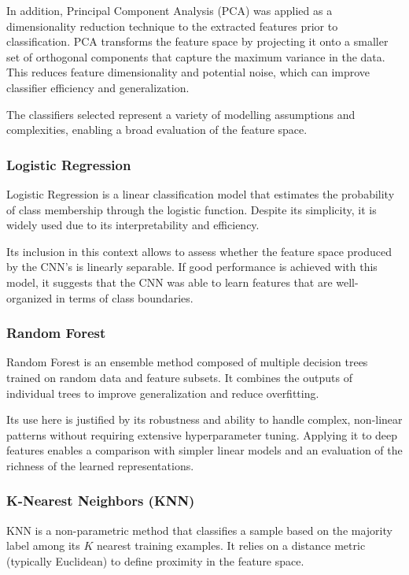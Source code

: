 \documentclass[journal,article,submit,pdftex,moreauthors]{Definitions/mdpi}
\begin{document}
In addition, Principal Component Analysis (PCA) was applied as a dimensionality reduction technique to the extracted features prior to classification. PCA transforms the feature space by projecting it onto a smaller set of orthogonal components that capture the maximum variance in the data. This reduces feature dimensionality and potential noise, which can improve classifier efficiency and generalization.

The classifiers selected represent a variety of modelling assumptions and complexities, enabling a broad evaluation of the feature space.

\subsubsection*{Logistic Regression}

Logistic Regression is a linear classification model that estimates the probability of class membership through the logistic function. Despite its simplicity, it is widely used due to its interpretability and efficiency.

Its inclusion in this context allows to assess whether the feature space produced by the CNN's is linearly separable. If good performance is achieved with this model, it suggests that the CNN was able to learn features that are well-organized in terms of class boundaries.

\subsubsection*{Random Forest}

Random Forest is an ensemble method composed of multiple decision trees trained on random data and feature subsets. It combines the outputs of individual trees to improve generalization and reduce overfitting.

Its use here is justified by its robustness and ability to handle complex, non-linear patterns without requiring extensive hyperparameter tuning. Applying it to deep features enables a comparison with simpler linear models and an evaluation of the richness of the learned representations.

\subsubsection*{K-Nearest Neighbors (KNN)}

KNN is a non-parametric method that classifies a sample based on the majority label among its $K$ nearest training examples. It relies on a distance metric (typically Euclidean) to define proximity in the feature space.
\end{document}
